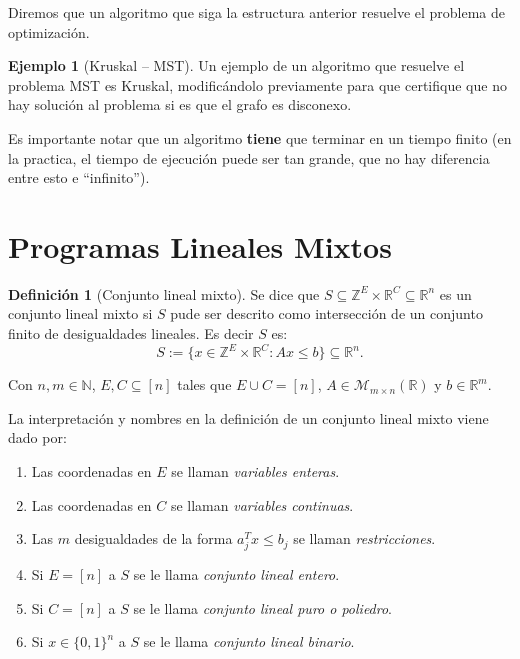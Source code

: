 \documentclass[10pt]{article}
\newcommand{\RR}{\mathbb R}
\newcommand{\NN}{\mathbb N}
\newcommand{\ZZ}{\mathbb Z}
\theoremstyle{plain}
\theoremstyle{definition}
\newtheorem{defi}{Definición}
\newtheorem{eje}{Ejemplo}
\begin{document}
Diremos que un algoritmo que siga la estructura anterior resuelve el problema de optimización.

\begin{eje}[Kruskal -- MST]
Un ejemplo de un algoritmo que resuelve el problema MST es Kruskal, modificándolo previamente  para que certifique que no hay solución al problema si es que el grafo es disconexo.
\end{eje}

Es importante notar que un algoritmo \textbf{tiene} que terminar en un tiempo finito (en la practica, el tiempo de ejecución puede ser tan grande, que no hay diferencia entre esto e ``infinito'').

\newpage

\section{Programas Lineales Mixtos}

\begin{defi}[Conjunto lineal mixto] Se dice que $S \subseteq \ZZ^{E} \times \RR^{C} \subseteq \RR^{n}$ es un conjunto lineal mixto si $S$ pude ser descrito como intersección de un conjunto finito de desigualdades lineales. Es decir $S$ es:
\[
S:=\{x \in \ZZ^{E} \times \RR^{C} : Ax \leq b\} \subseteq \RR^{n}.
\]

Con $n,m \in \NN$, $E,C \subseteq [n]$ tales que $E \cup C = [n]$, $A \in \mathcal{M}_{m \times n}(\RR)$ y $b \in \RR^{m}$.

La interpretación y nombres en la definición de un conjunto lineal mixto viene dado por:

\begin{enumerate}
    \item Las coordenadas en $E$ se llaman \emph{variables enteras}.
    \item Las coordenadas en $C$ se llaman \emph{variables continuas}.
    \item Las $m$ desigualdades de la forma $a_{j}^{T}x \leq b_{j}$ se llaman \emph{restricciones}.
    \item Si $E=[n]$ a $S$ se le llama \emph{conjunto lineal entero}.
    \item Si $C=[n]$ a $S$ se le llama \emph{conjunto lineal puro o poliedro}.
    \item Si $x \in \{0,1\}^{n}$ a $S$ se le llama \emph{conjunto lineal binario}.
\end{enumerate}
\end{defi}
\end{document}
